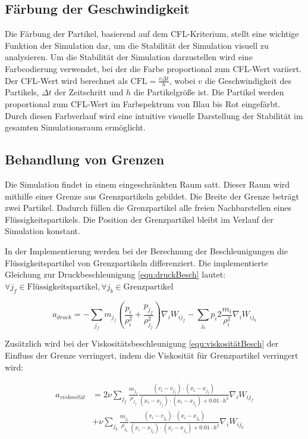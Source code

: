 \documentclass[a4paper, 12pt]{article}
\begin{document}
\subsection{Färbung der Geschwindigkeit}
Die Färbung der Partikel, basierend auf dem CFL-Kriterium, stellt eine wichtige Funktion der Simulation dar, um die Stabilität der Simulation visuell zu analysieren. Um die Stabilität der Simulation darzustellen wird eine Farbcodierung verwendet, bei der die Farbe proportional zum CFL-Wert variiert.
Der CFL-Wert wird berechnet als $\text{CFL} = \frac{v \Delta t}{h}$, wobei \(v\) die Geschwindigkeit des Partikels, \(\Delta t\) der Zeitschritt und \(h\) die Partikelgröße ist.
Die Partikel werden proportional zum CFL-Wert im Farbspektrum von Blau bis Rot eingefärbt. Durch diesen Farbverlauf wird eine intuitive visuelle Darstellung der Stabilität im gesamten Simulationsraum ermöglicht.
 
\subsection{Behandlung von Grenzen}
Die Simulation findet in einem eingeschränkten Raum satt. Dieser Raum wird mithilfe einer Grenze aus Grenzpartikeln gebildet. Die Breite der Grenze beträgt zwei Partikel. Dadurch füllen die Grenzpartikel alle freien Nachbarstellen eines Flüssigkeitspartikels. Die Position der  Grenzpartikel bleibt im Verlauf der Simulation konstant. 

In der Implementierung werden bei der Berechnung der Beschleunigungen die Flüssigkeitspartikel von Grenzpartikeln differenziert. Die implementierte Gleichung zur Druckbeschleunigung \eqref{equ:druckBesch} lautet: $\forall j_f \in \text{Flüssigkeitspartikel}, \forall j_b \in \text{Grenzpartikel}$ 

\begin{equation} \label{equ:druckBeschGrenze}
	a_{druck} = -\sum_{j_f} m_{j_f} \left( \frac{p_i}{\rho_i^2} + \frac{p_{j_f}}{\rho_{j_f}^2} \right) \nabla_i W_{i{j_f}} -\sum_{j_b} p_i 2\frac{m_i}{\rho_i^2} \nabla_i W_{i{j_b}}
\end{equation}

Zusätzlich wird bei der Viskositätsbeschleunigung \eqref{equ:viskositätBesch} der Einfluss der Grenze verringert, indem die Viskosität für Grenzpartikel verringert wird:

\begin{align}
	a_{viskosität} &= 2 \nu \sum_{j_f} \frac{m_{j_f}}{\rho_{j_f}} \frac{(v_i - v_{j_f}) \cdot (x_i - x_{j_f})}{(x_i - x_{j_f}) \cdot (x_i - x_{j_f}) + 0.01\cdot h^2} \nabla_i W_{i{j_f}} \nonumber \\
	&+ \nu \sum_{j_b} \frac{m_{j_b}}{\rho_{j_b}} \frac{(v_i - v_{j_b}) \cdot (x_i - x_{j_b})}{(x_i - x_{j_b}) \cdot (x_i - x_{j_b}) + 0.01\cdot h^2} \nabla_i W_{i{j_b}} \label{equ:viskositätBeschGrenze}
\end{align}
\end{document}
